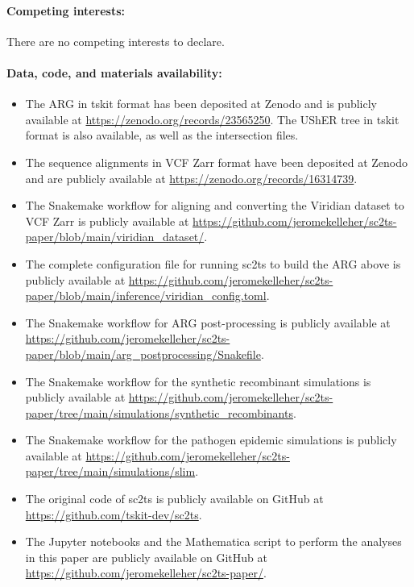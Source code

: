 \documentclass[12pt]{article}
\begin{document}
\paragraph*{Competing interests:}
There are no competing interests to declare.

\paragraph*{Data, code, and materials availability:}
\begin{itemize}
\item The ARG in tskit format has been deposited at Zenodo and is publicly
available at \url{https://zenodo.org/records/23565250}. The UShER tree
in tskit format is also available, as well as the intersection files.
\item The sequence alignments in VCF Zarr format have been deposited at
Zenodo and are publicly available at \url{https://zenodo.org/records/16314739}.
\item The Snakemake workflow for aligning and converting the Viridian dataset to VCF Zarr is publicly available at \url{https://github.com/jeromekelleher/sc2ts-paper/blob/main/viridian\_dataset/}.
\item The complete configuration file for running sc2ts to build the ARG above is
publicly available at \url{https://github.com/jeromekelleher/sc2ts-paper/blob/main/inference/viridian\_config.toml}.
\item The Snakemake workflow for ARG post-processing is publicly
available at \url{https://github.com/jeromekelleher/sc2ts-paper/blob/main/arg_postprocessing/Snakefile}.
\item The Snakemake workflow for the synthetic recombinant simulations is publicly
available at \url{https://github.com/jeromekelleher/sc2ts-paper/tree/main/simulations/synthetic_recombinants}.
\item The Snakemake workflow for the pathogen epidemic simulations is publicly
available at \url{https://github.com/jeromekelleher/sc2ts-paper/tree/main/simulations/slim}.
\item The original code of sc2ts is publicly available on
GitHub at \url{https://github.com/tskit-dev/sc2ts}.
\item The Jupyter notebooks and the Mathematica script to perform the analyses in this paper are publicly available on GitHub at \url{https://github.com/jeromekelleher/sc2ts-paper/}.
\end{itemize}


\end{document}

